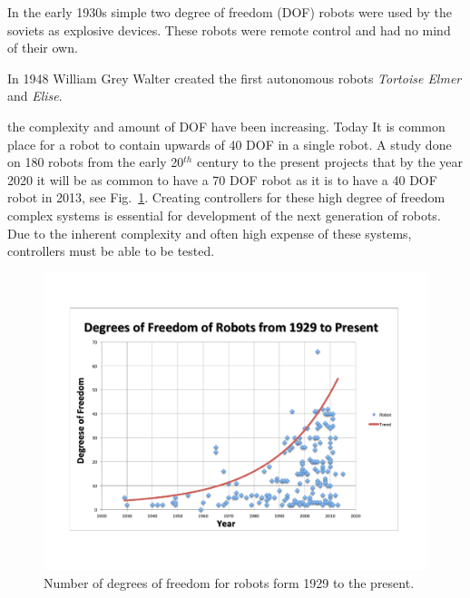 In the early 1930s simple two degree of freedom (DOF) robots were used by the soviets as explosive devices.
These robots were remote control and had no mind of their own.

In 1948 William Grey Walter created the first autonomous robots \textit{Tortoise Elmer} and \textit{Elise}\cite{robotElmer}.


 the complexity and amount of DOF have been increasing.
Today It is common place for a robot to contain upwards of 40 DOF in a single robot.
A study done on 180 robots from the early 20$^{th}$ century to the present projects that by the year 2020 it will be as common to have a 70 DOF robot as it is to have a 40 DOF robot in 2013, see Fig.~\ref{fig:numOfRobots}. 
Creating controllers for these high degree of freedom complex systems is essential for development of the next generation of robots.
Due to the inherent complexity and often high expense of these systems, controllers must be able to be tested.



\begin{figure}[thpb]
  \centering
      \includegraphics[width=0.8\columnwidth]{./pix/robotsDOF.pdf}
\caption{Number of degrees of freedom for robots form 1929 to the present.}
\label{fig:numOfRobots}
\end{figure}





